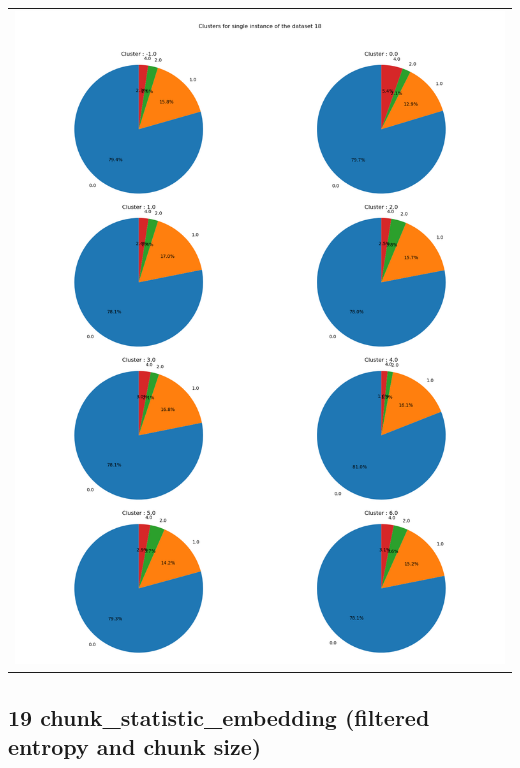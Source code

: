 \begin{longtable}{|c|c|c|c|c|}
\multicolumn{5}{|c|}{\includegraphics[width=0.8\linewidth]{img/annexes/18/clustering_pie_charts/single instance.png}} \\
\end{longtable}


\subsection{19 chunk\_statistic\_embedding (filtered entropy and chunk size)}

